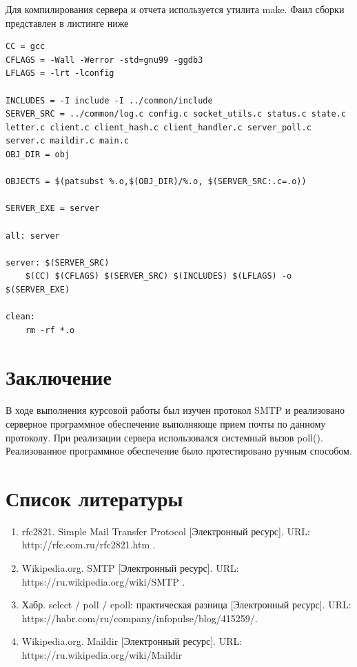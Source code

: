 \documentclass[a4paper,12pt]{report}
\begin{document}


	  Для компилирования сервера и отчета используется утилита make. 
	  Фаил сборки представлен в листинге ниже
	  \begin{Verbatim}
CC = gcc
CFLAGS = -Wall -Werror -std=gnu99 -ggdb3
LFLAGS = -lrt -lconfig

INCLUDES = -I include -I ../common/include
SERVER_SRC = ../common/log.c config.c socket_utils.c status.c state.c letter.c client.c client_hash.c client_handler.c server_poll.c server.c maildir.c main.c
OBJ_DIR = obj

OBJECTS = $(patsubst %.o,$(OBJ_DIR)/%.o, $(SERVER_SRC:.c=.o))

SERVER_EXE = server

all: server

server: $(SERVER_SRC)
	$(CC) $(CFLAGS) $(SERVER_SRC) $(INCLUDES) $(LFLAGS) -o $(SERVER_EXE)

clean:
	rm -rf *.o

	  \end{Verbatim}

	\chapter{Заключение}

	В ходе выполнения курсовой работы был изучен протокол SMTP и реализовано 
	серверное программное обеспечение выполняюще прием почты по данному протоколу.
	 При реализации сервера  использовался системный вызов poll().
	  Реализованное программное обеспечение было протестировано ручным способом.

	

	\chapter{Список литературы}

	\begin{enumerate}
		\item rfc2821. Simple Mail Transfer Protocol [Электронный ресурс]. URL: http://rfc.com.ru/rfc2821.htm .
		\item Wikipedia.org. SMTP [Электронный ресурс]. URL: https://ru.wikipedia.org/wiki/SMTP .
		\item Хабр. select / poll / epoll: практическая разница [Электронный ресурс]. URL: https://habr.com/ru/company/infopulse/blog/415259/.
		\item Wikipedia.org. Maildir [Электронный ресурс]. URL: https://ru.wikipedia.org/wiki/Maildir
	\end{enumerate}
	
\end{document}

